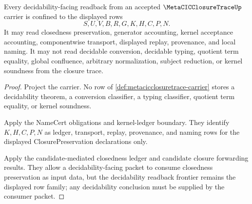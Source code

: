 \begin{theorem}
\label{thm:metacicclosuretrace-decidability-readback-frontier}
Every decidability-facing readback from an accepted $\MetaCICClosureTraceUp$ carrier is confined to the displayed rows
$$
S,U,V,B,R,G,K,H,C,P,N .
$$
It may read closedness preservation, generator accounting, kernel acceptance accounting, componentwise transport, displayed replay, provenance, and local naming. It may not read decidable conversion, decidable typing, quotient term equality, global confluence, arbitrary normalization, subject reduction, or kernel soundness from the closure trace.
\end{theorem}
\begin{proof}
Project the carrier. No row of \autoref{def:metacicclosuretrace-carrier} stores a decidability theorem, a conversion classifier, a typing classifier, quotient term equality, or kernel soundness.

Apply the NameCert obligations and kernel-ledger boundary. They identify $K,H,C,P,N$ as ledger, transport, replay, provenance, and naming rows for the displayed ClosurePreservation declarations only.

Apply the candidate-mediated closedness ledger and candidate closure forwarding results. They allow a decidability-facing packet to consume closedness preservation as input data, but the decidability readback frontier remains the displayed row family; any decidability conclusion must be supplied by the consumer packet.
\end{proof}

